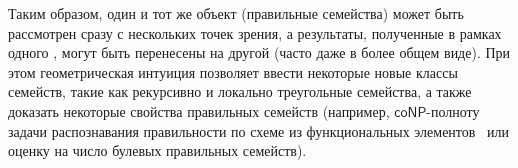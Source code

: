     Таким образом, один и тот же объект (правильные семейства) может быть рассмотрен сразу с нескольких точек зрения, а результаты, полученные в рамках одного , могут быть перенесены на другой  (часто даже в более общем виде).
    При этом геометрическая интуиция позволяет ввести некоторые новые классы семейств, такие как рекурсивно и локально треугольные семейства, а также доказать некоторые свойства правильных семейств (например, $\mathsf{coNP}$-полноту задачи распознавания правильности по схеме из функциональных элементов~\cite{USOcomplexity, galatenko21generation} или оценку на число булевых правильных семейств).
